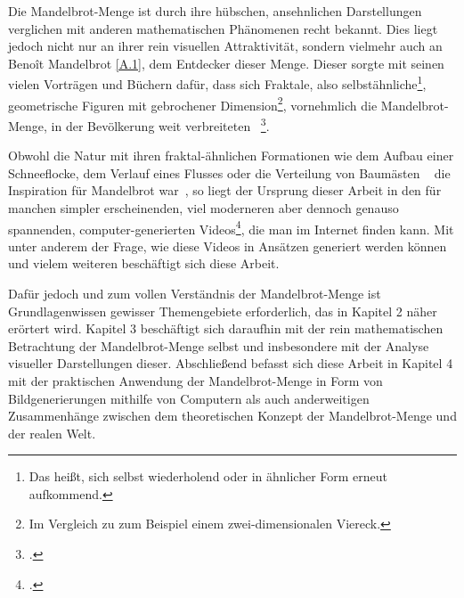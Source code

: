 
Die Mandelbrot-Menge ist durch ihre hübschen, ansehnlichen Darstellungen verglichen
mit anderen mathematischen Phänomenen recht bekannt.
Dies liegt jedoch nicht nur an ihrer rein visuellen Attraktivität,
sondern vielmehr auch an Benoît Mandelbrot \hyperref[app:1]{[A.1]},
dem Entdecker dieser Menge.
Dieser sorgte mit seinen vielen Vorträgen und Büchern dafür, dass sich Fraktale,
also selbstähnliche\footnote{
  Das heißt, sich selbst wiederholend oder in ähnlicher Form erneut aufkommend.
}, geometrische Figuren mit gebrochener Dimension\footnote{
  Im Vergleich zu zum Beispiel einem zwei-dimensionalen Viereck.
}, vornehmlich die Mandelbrot-Menge, in der Bevölkerung weit verbreiteten
~\footcite[Vgl. letzten Absatz]{ibm_fractal_2011}.

Obwohl die Natur mit ihren fraktal-ähnlichen Formationen wie dem Aufbau einer
Schneeflocke, dem Verlauf eines Flusses oder die Verteilung von Baumästen
~\cite{nnart_fractals_nodate} die Inspiration für Mandelbrot war~\cite{zink_kosmische_2014},
so liegt der Ursprung dieser Arbeit in den für
manchen simpler erscheinenden, viel moderneren aber dennoch genauso spannenden,
computer-generierten Videos\footcite[Vgl. bspw.][]{maths_town_eye_2017},
die man im Internet finden kann.
Mit unter anderem der Frage, wie diese Videos in Ansätzen generiert werden können
und vielem weiteren beschäftigt sich diese Arbeit.

Dafür jedoch und zum vollen Verständnis der Mandelbrot-Menge ist Grundlagenwissen
gewisser Themengebiete erforderlich, das in Kapitel 2 näher erörtert wird.
Kapitel 3 beschäftigt sich daraufhin mit der rein mathematischen Betrachtung der
Mandelbrot-Menge selbst und insbesondere mit der Analyse visueller Darstellungen dieser.
Abschließend befasst sich diese Arbeit in Kapitel 4 mit der praktischen Anwendung
der Mandelbrot-Menge in Form von Bildgenerierungen mithilfe von Computern als auch
anderweitigen Zusammenhänge zwischen dem theoretischen Konzept
der Mandelbrot-Menge und der realen Welt.